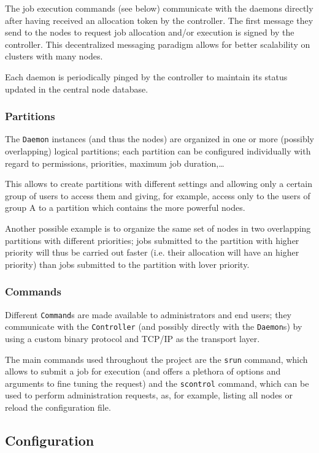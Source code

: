 The job execution commands (see below) communicate with the daemons directly after having received an allocation token by the controller. The first message they send to the nodes to request job allocation and/or execution is signed by the controller. This decentralized messaging paradigm allows for better scalability on clusters with many nodes.

Each daemon is periodically pinged by the controller to maintain its status updated in the central node database.

\subsubsection{Partitions}
The \texttt{Daemon} instances (and thus the nodes) are organized in one or more (possibly overlapping) logical partitions; each partition can be configured individually with regard to permissions, priorities, maximum job duration,…

This allows to create partitions with different settings and allowing only a certain group of users to access them and giving, for example, access only to the users of group A to a partition which contains the more powerful nodes. 

Another possible example is to organize the same set of nodes in two overlapping partitions with different priorities; jobs submitted to the partition with higher priority will thus be carried out faster (i.e. their allocation will have an higher priority) than jobs submitted to the partition with lover priority.
	
\subsubsection{Commands}
Different \texttt{Command}s are made available to administrators and end users; they communicate with the \texttt{Controller} (and possibly directly with the \texttt{Daemon}s) by using a custom binary protocol and TCP/IP as the transport layer.

The main commands used throughout the project are the \texttt{srun} command, which allows to submit a job for execution (and offers a plethora of options and arguments to fine tuning the request) and the \texttt{scontrol} command, which can be used to perform administration requests, as, for example, listing all nodes or reload the configuration file.



\subsection{Configuration}

